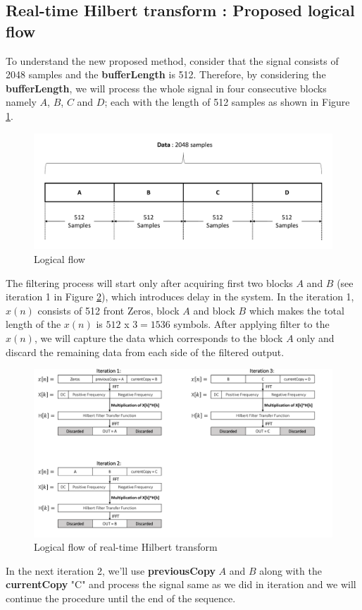 \begin{refsection}
\subsection*{Real-time Hilbert transform : Proposed logical flow}
To understand the new proposed method, consider that the signal consists of 2048 samples and the \textbf{bufferLength} is 512. Therefore, by considering the \textbf{bufferLength}, we will process the whole signal in four consecutive blocks namely $A$, $B$, $C$ and $D$; each with the length of 512 samples as shown in Figure \ref{data}.
\begin{figure}[h]
	\centering
	\includegraphics[width=14cm]{./algorithms/hilbert/figures/data.pdf}
	\caption{Logical flow}
	\label{data}
\end{figure}
The filtering process will start only after acquiring first two blocks $A$ and $B$ (see iteration 1 in Figure \ref{Logical flow}), which introduces delay in the system. In the iteration 1, $x(n)$ consists of 512 front Zeros, block $A$ and block $B$ which makes the total length of the $x(n)$ is $512$ x $3 = 1536$ symbols. After applying filter to the $x(n)$, we will capture the data which corresponds to the block $A$ only and discard the remaining data from each side of the filtered output.\\
\begin{figure}[h]
	\centering
	\includegraphics[width=14cm]{./algorithms/hilbert/figures/proposedLogic.pdf}
	\caption{Logical flow of real-time Hilbert transform}
	\label{Logical flow}
\end{figure}
In the next iteration 2, we'll use \textbf{previousCopy} $A$ and $B$ along with the \textbf{currentCopy} "C" and process the signal same as we did in iteration  and we will continue the procedure until the end of the sequence.

\end{refsection}
